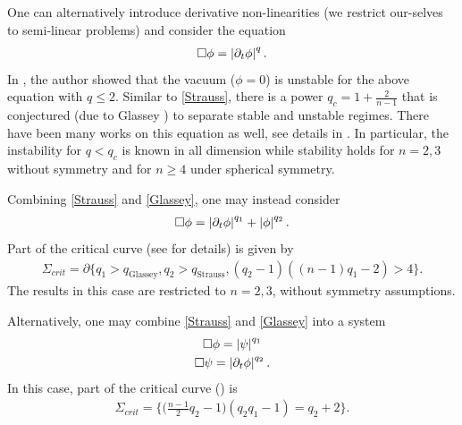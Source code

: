 \documentclass[11pt, oneside]{amsart}
\begin{document}
	One can alternatively introduce derivative non-linearities (we restrict our-selves to semi-linear problems) and consider the equation
	\begin{equation}\label{Glassey}
		\begin{gathered}
			\Box\phi=\left\lvert \partial_t\phi\right\rvert^q.
		\end{gathered}
	\end{equation}
	In \cite{john_blow-up_1981}, the author showed that the vacuum ($\phi=0$) is unstable for the above equation with $q\leq2$. Similar to \eqref{Strauss}, there is a power $q_c=1+\frac{2}{n-1}$ that is conjectured (due to Glassey \cite{glassey_finite-time_1981}) to separate stable and unstable regimes. There have been many works on this equation as well, see details in \cite{hidano_glassey_2012}. In particular, the instability for $q<q_c$ is known in all dimension while stability holds for $n=2,3$ without symmetry and for $n\geq4$ under spherical symmetry.
	
	Combining \eqref{Strauss} and \eqref{Glassey}, one may instead consider
	\begin{equation}\label{Strauss Glassey}
		\begin{gathered}
			\Box\phi=\left\lvert \partial_t\phi\right\rvert^{q_1}+\left\lvert \phi\right\rvert^{q_2}.
		\end{gathered}
	\end{equation}
	Part of the critical curve (see \cite{hidano_combined_2016} for details) is given by
	\begin{equation*}
		\begin{gathered}
			\Sigma_{crit}=\partial\Big\{q_1>q_{\text{Glassey}},q_2>q_{\text{Strauss}},(q_2-1)((n-1)q_1-2)>4\Big\}.
		\end{gathered}
	\end{equation*}
	The results in this case are restricted to $n=2,3$, without symmetry assumptions.

	Alternatively, one may combine \eqref{Strauss} and \eqref{Glassey} into a system
	\begin{equation}\label{Strauss Glassey system}
		\begin{gathered}
			\Box\phi=\left\lvert \psi\right\rvert^{q_1}\\
			\Box\psi=\left\lvert \partial_t\phi\right\rvert^{q_2}.
		\end{gathered}
	\end{equation}
	In this case, part of the critical curve (\cite{hidano_life_2016}) is 
	\begin{equation*}
		\begin{gathered}
			\Sigma_{crit}=\bigg\{\Big(\frac{n-1}{2}q_2-1\Big)(q_2q_1-1)=q_2+2\bigg\}.
		\end{gathered}
	\end{equation*}
	
\end{document}
